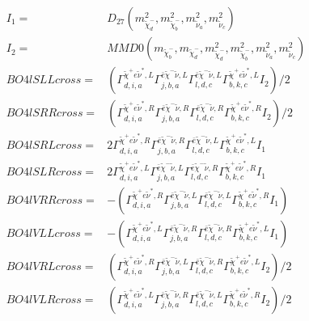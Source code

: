 \documentclass[A4,landscape]{article}
\begin{document}
\begin{align} 
I_1 = & D_{27}(m^2_{\tilde{\chi}^-_{{d}}}, m^2_{\tilde{\chi}^-_{{b}}}, m^2_{\tilde{\nu}_{{a}}}, m^2_{\tilde{\nu}_{{c}}}) \\ 
I_2 = & MMD0(m_{\tilde{\chi}^-_{{b}}}, m_{\tilde{\chi}^-_{{d}}}, m^2_{\tilde{\chi}^-_{{d}}}, m^2_{\tilde{\chi}^-_{{b}}}, m^2_{\tilde{\nu}_{{a}}}, m^2_{\tilde{\nu}_{{c}}}) \\ 
  BO4lSLLcross= & ( \Gamma^{\tilde{\chi}^+e \tilde{\nu}^*,L}_{d, i, a} \Gamma^{\bar{e}\tilde{\chi}^- \tilde{\nu} ,L}_{j, b, a} \Gamma^{\bar{e}\tilde{\chi}^- \tilde{\nu} ,L}_{l, d, c} \Gamma^{\tilde{\chi}^+e \tilde{\nu}^*,L}_{b, k, c} I_2)/2 \\ 
  BO4lSRRcross= & ( \Gamma^{\tilde{\chi}^+e \tilde{\nu}^*,R}_{d, i, a} \Gamma^{\bar{e}\tilde{\chi}^- \tilde{\nu} ,R}_{j, b, a} \Gamma^{\bar{e}\tilde{\chi}^- \tilde{\nu} ,R}_{l, d, c} \Gamma^{\tilde{\chi}^+e \tilde{\nu}^*,R}_{b, k, c} I_2)/2 \\ 
  BO4lSRLcross= & 2  \Gamma^{\tilde{\chi}^+e \tilde{\nu}^*,R}_{d, i, a} \Gamma^{\bar{e}\tilde{\chi}^- \tilde{\nu} ,R}_{j, b, a} \Gamma^{\bar{e}\tilde{\chi}^- \tilde{\nu} ,L}_{l, d, c} \Gamma^{\tilde{\chi}^+e \tilde{\nu}^*,L}_{b, k, c} I_1 \\ 
  BO4lSLRcross= & 2  \Gamma^{\tilde{\chi}^+e \tilde{\nu}^*,L}_{d, i, a} \Gamma^{\bar{e}\tilde{\chi}^- \tilde{\nu} ,L}_{j, b, a} \Gamma^{\bar{e}\tilde{\chi}^- \tilde{\nu} ,R}_{l, d, c} \Gamma^{\tilde{\chi}^+e \tilde{\nu}^*,R}_{b, k, c} I_1 \\ 
  BO4lVRRcross= & -( \Gamma^{\tilde{\chi}^+e \tilde{\nu}^*,R}_{d, i, a} \Gamma^{\bar{e}\tilde{\chi}^- \tilde{\nu} ,L}_{j, b, a} \Gamma^{\bar{e}\tilde{\chi}^- \tilde{\nu} ,L}_{l, d, c} \Gamma^{\tilde{\chi}^+e \tilde{\nu}^*,R}_{b, k, c} I_1) \\ 
  BO4lVLLcross= & -( \Gamma^{\tilde{\chi}^+e \tilde{\nu}^*,L}_{d, i, a} \Gamma^{\bar{e}\tilde{\chi}^- \tilde{\nu} ,R}_{j, b, a} \Gamma^{\bar{e}\tilde{\chi}^- \tilde{\nu} ,R}_{l, d, c} \Gamma^{\tilde{\chi}^+e \tilde{\nu}^*,L}_{b, k, c} I_1) \\ 
  BO4lVRLcross= & ( \Gamma^{\tilde{\chi}^+e \tilde{\nu}^*,R}_{d, i, a} \Gamma^{\bar{e}\tilde{\chi}^- \tilde{\nu} ,L}_{j, b, a} \Gamma^{\bar{e}\tilde{\chi}^- \tilde{\nu} ,R}_{l, d, c} \Gamma^{\tilde{\chi}^+e \tilde{\nu}^*,L}_{b, k, c} I_2)/2 \\ 
  BO4lVLRcross= & ( \Gamma^{\tilde{\chi}^+e \tilde{\nu}^*,L}_{d, i, a} \Gamma^{\bar{e}\tilde{\chi}^- \tilde{\nu} ,R}_{j, b, a} \Gamma^{\bar{e}\tilde{\chi}^- \tilde{\nu} ,L}_{l, d, c} \Gamma^{\tilde{\chi}^+e \tilde{\nu}^*,R}_{b, k, c} I_2)/2 \\ 

\end{align}
\end{document}
